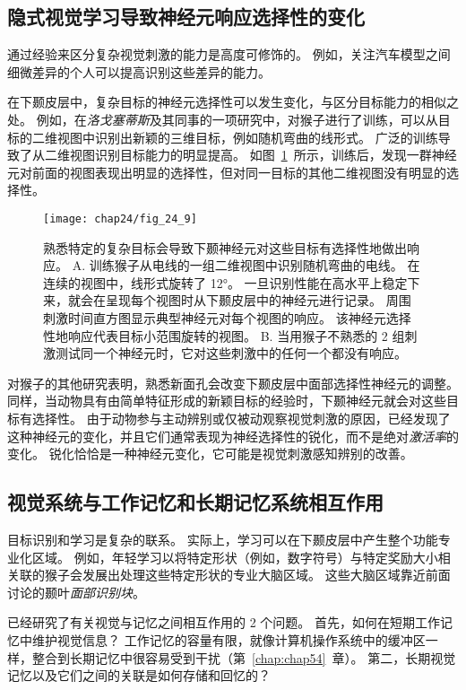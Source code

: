 \subsection{隐式视觉学习导致神经元响应选择性的变化}

通过经验来区分复杂视觉刺激的能力是高度可修饰的。
例如，关注汽车模型之间细微差异的个人可以提高识别这些差异的能力。


在下颞皮层中，复杂目标的神经元选择性可以发生变化，与区分目标能力的相似之处。
例如，在\textit{洛戈塞蒂斯}及其同事的一项研究中，对猴子进行了训练，可以从目标的二维视图中识别出新颖的三维目标，例如随机弯曲的线形式\cite{logothetis1995psychophysical}。
广泛的训练导致了从二维视图识别目标能力的明显提高。
如图~\ref{fig:24_9}~所示，训练后，发现一群神经元对前面的视图表现出明显的选择性，但对同一目标的其他二维视图没有明显的选择性。


\begin{figure}[htbp]
	\centering
	\texttt{[image: chap24/fig\_24\_9]}
	\caption{熟悉特定的复杂目标会导致下颞神经元对这些目标有选择性地做出响应。
		A. 训练猴子从电线的一组二维视图中识别随机弯曲的电线。 在连续的视图中，线形式旋转了 12°。
		一旦识别性能在高水平上稳定下来，就会在呈现每个视图时从下颞皮层中的神经元进行记录。
		周围刺激时间直方图显示典型神经元对每个视图的响应。
		该神经元选择性地响应代表目标小范围旋转的视图。
		B. 当用猴子不熟悉的 2 组刺激测试同一个神经元时，它对这些刺激中的任何一个都没有响应。}
	\label{fig:24_9}
\end{figure}


对猴子的其他研究表明，熟悉新面孔会改变下颞皮层中面部选择性神经元的调整。
同样，当动物具有由简单特征形成的新颖目标的经验时，下颞神经元就会对这些目标有选择性。
由于动物参与主动辨别或仅被动观察视觉刺激的原因，已经发现了这种神经元的变化，并且它们通常表现为神经选择性的锐化，而不是绝对\textit{激活率}的变化。
锐化恰恰是一种神经元变化，它可能是视觉刺激感知辨别的改善。



\subsection{视觉系统与工作记忆和长期记忆系统相互作用}

目标识别和学习是复杂的联系。
实际上，学习可以在下颞皮层中产生整个功能专业化区域。
例如，年轻学习以将特定形状（例如，数字符号）与特定奖励大小相关联的猴子会发展出处理这些特定形状的专业大脑区域。
这些大脑区域靠近前面讨论的颞叶\textit{面部识别块}。


已经研究了有关视觉与记忆之间相互作用的 2 个问题。
首先，如何在短期工作记忆中维护视觉信息？
工作记忆的容量有限，就像计算机操作系统中的缓冲区一样，整合到长期记忆中很容易受到干扰（第~\ref{chap:chap54}~章）。
第二，长期视觉记忆以及它们之间的关联是如何存储和回忆的？


